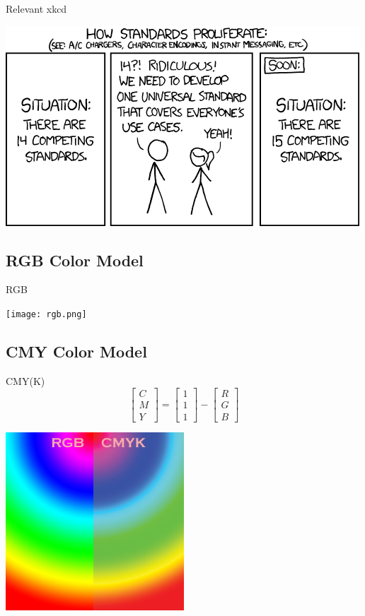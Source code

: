 \documentclass[pdf]{beamer}
\begin{document}
\begin{frame}{Relevant xkcd}
\begin{center}
  \includegraphics[width=\textwidth]{standards.png}
\end{center}
\end{frame}

\subsection{RGB Color Model}
\begin{frame}{RGB}
\begin{center}
  \texttt{[image: rgb.png]}
\end{center}
\end{frame}

\subsection{CMY Color Model}
\begin{frame}{CMY(K)}
\[\begin{bmatrix}C\\M\\Y\end{bmatrix}
= \begin{bmatrix}1\\1\\1\end{bmatrix}
- \begin{bmatrix}R\\G\\B\end{bmatrix}\]
\begin{center}
  \includegraphics[width=0.5\textwidth]{rgb-vs-cmyk.jpg}
\end{center}
\end{frame}
\end{document}
